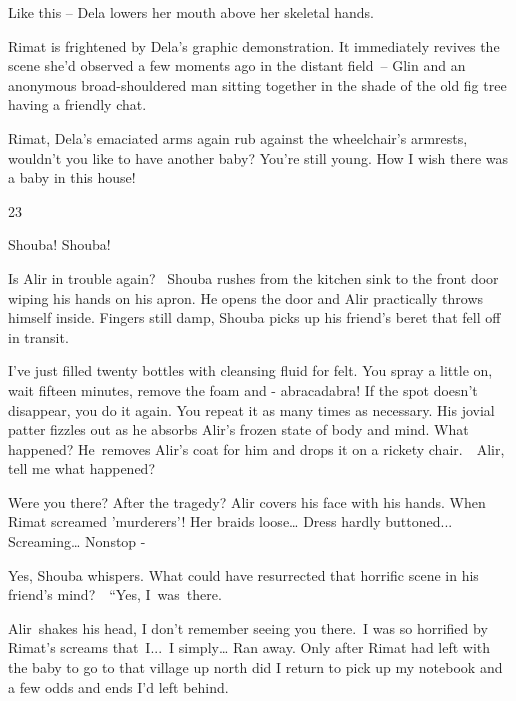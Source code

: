 \documentclass[letterpaper]{article}
\begin{document}
{\textquotedbl}Like this --{\textquotedbl} Dela lowers her mouth above her skeletal hands. 

Rimat is frightened by Dela's graphic demonstration. It immediately revives the scene she'd observed a few moments ago
in the distant field\ {}-- Glin and an anonymous broad-shouldered man sitting together in the shade of the old fig tree
having a friendly chat.\ 

{\textquotedbl}Rimat,{\textquotedbl} Dela's emaciated arms again rub against the wheelchair's armrests,
{\textquotedbl}wouldn't you like to have another baby? You're still young. How I wish there was a baby in this
house!{\textquotedbl}


\bigskip

23~

{\textquotedbl}Shouba! Shouba!{\textquotedbl}

Is Alir in trouble again?~ Shouba rushes from the kitchen sink to the front door wiping his hands on his apron. He opens
the door and Alir practically throws himself inside. Fingers still damp, Shouba picks up his friend's beret that fell
off in transit. 

{\textquotedbl}I've just filled twenty bottles with cleansing fluid for felt. You spray a little on, wait fifteen
minutes, remove the foam and - abracadabra! If the spot doesn't disappear, you do it again. You repeat it as many times
as necessary.{\textquotedbl} His jovial patter fizzles out as he absorbs Alir's frozen state of body and mind.
{\textquotedbl}What happened?{\textquotedbl} He\ removes Alir's coat for him and drops it on a rickety
chair.\ \ {\textquotedbl}Alir, tell me what happened?{\textquotedbl} 

{\textquotedbl}Were you there? After the tragedy?{\textquotedbl} Alir covers his face with his hands.
{\textquotedbl}When Rimat screamed 'murderers'! Her braids loose{\dots} Dress hardly buttoned... Screaming{\dots}
Nonstop -{\textquotedbl}

{\textquotedbl}Yes,{\textquotedbl} Shouba whispers. What could have resurrected that horrific scene in his friend's
mind?\ \ {}``Yes, I\ was\ there.{\textquotedbl}

Alir~shakes his head, {\textquotedbl}I don't remember seeing you there.\textcolor{red}{\ }I was so horrified by Rimat's
screams that\ I...\ I simply{\dots} Ran away. Only after Rimat had left with the baby to go to that village up north
did I return to pick up my notebook and a few odds and ends I'd left behind.{\textquotedbl}
\end{document}
